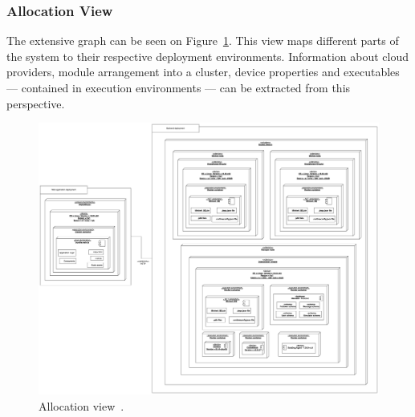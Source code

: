 \subsubsection*{Allocation View}

The extensive graph can be seen on Figure~\ref{fig:allocationview}. This view maps different parts of the system to their respective deployment environments. Information about cloud providers, module arrangement into a cluster, device properties and executables — contained in execution environments — can be extracted from this perspective.

\begin{figure}
    \centering
    \includegraphics[width=\linewidth,height=\textheight,keepaspectratio]{images/architectural_views/minitwit_allocation_view.png}
    \caption{Allocation view~\cite{allocationView}.}
    \label{fig:allocationview}
\end{figure}

